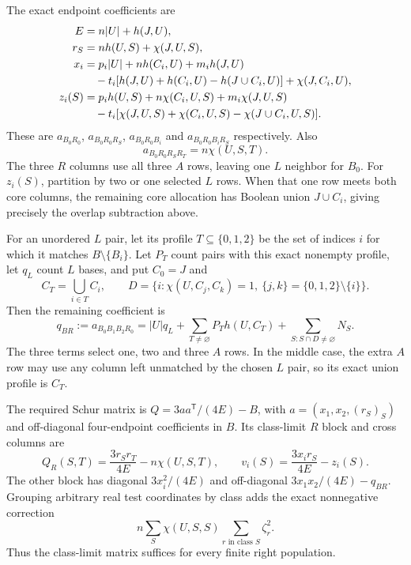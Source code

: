 \documentclass[11pt,a4paper]{article}
\theoremstyle{remark}\newtheorem{remark}[theorem]{Remark}
\begin{document}
The exact endpoint coefficients are
\begin{align}
 E&=n|U|+h(J,U),\notag\\
 r_S&=nh(U,S)+\chi(J,U,S),\notag\\
 x_i&=p_i|U|+nh(C_i,U)+m_ih(J,U)\notag\\
 &\quad-t_i[h(J,U)+h(C_i,U)-h(J\cup C_i,U)]+\chi(J,C_i,U),\label{mrn:t:tn:br:coeff}\\
 z_i(S)&=p_ih(U,S)+n\chi(C_i,U,S)+m_i\chi(J,U,S)\notag\\
 &\quad-t_i[\chi(J,U,S)+\chi(C_i,U,S)-\chi(J\cup C_i,U,S)].\notag
\end{align}
These are $a_{B_0R_0}$, $a_{B_0R_0R_S}$, $a_{B_0R_0B_i}$ and
$a_{B_0R_0B_iR_S}$ respectively. Also
\begin{equation}\label{mrn:t:tn:br:rr}
 a_{B_0R_0R_SR_T}=n\chi(U,S,T).
\end{equation}
The three $R$ columns use all three $A$ rows, leaving one $L$ neighbor for
$B_0$. For $z_i(S)$, partition by two or one selected $L$ rows. When that
one row meets both core columns, the remaining core allocation has Boolean
union $J\cup C_i$, giving precisely the overlap subtraction above.

For an unordered $L$ pair, let its profile $T\subseteq\{0,1,2\}$ be the
set of indices $i$ for which it matches $B\setminus\{B_i\}$.
Let $P_T$ count pairs with this exact nonempty profile, let $q_L$ count
$L$ bases, and put $C_0=J$ and
\[
 C_T=\bigcup_{i\in T}C_i,\qquad
 D=\{i:\chi(U,C_j,C_k)=1,\ \{j,k\}=\{0,1,2\}\setminus\{i\}\}.
\]
Then the remaining coefficient is
\begin{equation}\label{mrn:t:tn:br:q}
 q_{BR}:=a_{B_0B_1B_2R_0}
   =|U|q_L+\sum_{T\ne\varnothing}P_T h(U,C_T)
                  +\sum_{S:S\cap D\ne\varnothing}N_S.
\end{equation}
The three terms select one, two and three $A$ rows. In the middle case,
the extra $A$ row may use any column left unmatched by the chosen $L$ pair,
so its exact union profile is $C_T$.

The required Schur matrix is $Q=3aa^{\mathsf T}/(4E)-B$, with
$a=(x_1,x_2,(r_S)_S)$ and off-diagonal four-endpoint coefficients in $B$.
Its class-limit $R$ block and cross columns are
\begin{equation}\label{mrn:t:tn:br:matrix}
 Q_R(S,T)=\frac{3r_Sr_T}{4E}-n\chi(U,S,T),\qquad
 v_i(S)=\frac{3x_ir_S}{4E}-z_i(S).
\end{equation}
The other block has diagonal $3x_i^2/(4E)$ and off-diagonal
$3x_1x_2/(4E)-q_{BR}$. Grouping arbitrary real test coordinates by class
adds the exact nonnegative correction
\begin{equation}\label{mrn:t:tn:br:correction}
 n\sum_S\chi(U,S,S)\sum_{r\text{ in class }S}\zeta_r^2.
\end{equation}
Thus the class-limit matrix suffices for every finite right population.
\end{document}
